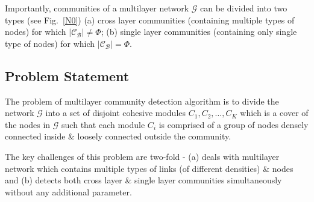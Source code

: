 Importantly, communities of a multilayer network $\mathcal{G}$ can be divided into two
types (see Fig.~\ref{N0}) (a) cross layer communities (containing multiple types of nodes) 
for which $\left \vert \mathcal{C_B} \right \vert \neq \Phi$;
(b) single layer communities (containing only single type of nodes) for which $\left \vert \mathcal{C_B} \right \vert = \Phi$.


\subsection{Problem Statement}
The problem of multilayer community detection algorithm is to divide the network $\mathcal{G}$ into a set of disjoint cohesive
modules $C_1, C_2,\dots,C_K$ which is a cover of the nodes in $\mathcal{G}$ such that each module $C_i$ is comprised of a group of
nodes densely connected inside \& loosely connected outside the community.



The key challenges of this problem are two-fold - (a) deals with multilayer network which contains multiple types of links (of different
densities) \& nodes and (b) detects both cross layer \& single layer communities simultaneously without any additional parameter.





